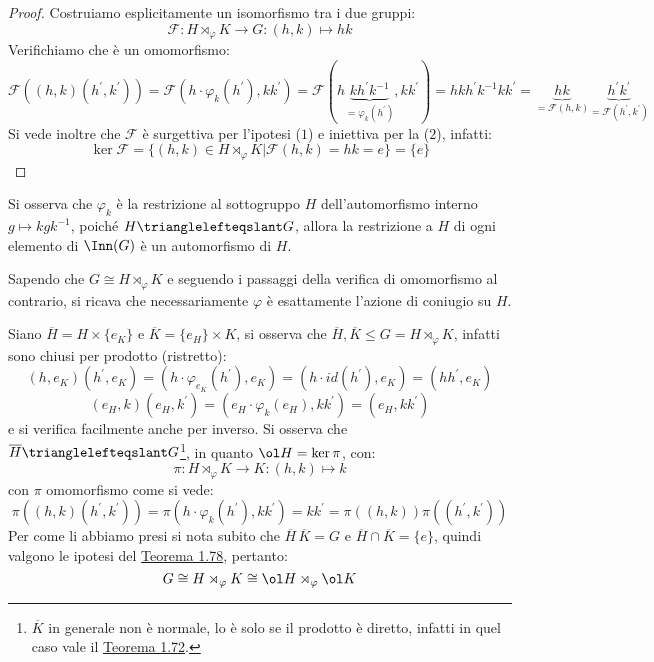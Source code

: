 \documentclass[11pt]{scrartcl}
\begin{document}
\begin{proof}
    Costruiamo esplicitamente un isomorfismo tra i due gruppi:
        \[ \mathcal{F} : H \rtimes_{\varphi} K \longrightarrow G : (h,k) \longmapsto hk
            \]
    Verifichiamo che è un omomorfismo:
        \[
            \mathcal{F}((h,k)(h^{\prime},k^{\prime})) = \mathcal{F}(h\cdot \varphi_k(h^{\prime}),kk^{\prime}) = \mathcal{F}(h\underbrace{kh^{\prime}k^{-1}}_{= \varphi_k(h^{\prime})},kk^{\prime})
            = hkh^{\prime}k^{-1}kk^{\prime} = \underbrace{hk}_{= \mathcal{F}(h,k)}\underbrace{h^{\prime}k^{\prime}}_{= \mathcal{F}(h^{\prime},k^{\prime})}
        \]
    Si vede inoltre che $\mathcal{F}$ è surgettiva per l'ipotesi ($1$) e iniettiva per la ($2$), infatti:
        \[ \ker\mathcal{F} = \{(h,k) \in  H \rtimes_{\varphi} K | \mathcal{F}(h,k) = hk = e\} = \{e\}
            \]
\end{proof}

\begin{remark}
    Si osserva che $\varphi_k$ è la restrizione al sottogruppo $H$ dell'automorfismo interno $g \longmapsto kgk^{-1}$, poiché
    $H \trianglelefteqslant G$, allora la restrizione a $H$ di ogni elemento di $\Inn(G)$ è un automorfismo di $H$.
\end{remark}

\begin{remark}
    Sapendo che $G \cong H \rtimes_{\varphi} K$ e seguendo i passaggi della verifica di omomorfismo al contrario, si ricava che necessariamente $\varphi$ è esattamente
    l'azione di coniugio su $H$.
\end{remark}

\pagebreak

\begin{remark}
    Siano $\overline H = H \times \{e_K\}$ e $\overline K = \{e_H\} \times K$, si osserva che $\overline H, \overline K \leqslant G = H \rtimes_{\varphi} K$, infatti sono chiusi per prodotto (ristretto):
        \[ (h,e_K)(h^{\prime},e_K) = (h \cdot \varphi_{e_K}(h^{\prime}), e_K) = (h \cdot id(h^{\prime}), e_K) = (hh^{\prime},e_K)
        \]\[ (e_H,k)(e_H,k^{\prime}) = (e_H \cdot \varphi_k(e_H), kk^{\prime}) = (e_H,kk^{\prime})
            \]
    e si verifica facilmente anche per inverso. Si osserva che $\overline H \trianglelefteqslant G$\footnote{$\overline K$ in generale non è normale, lo è solo se il prodotto è diretto, infatti in quel caso vale il \hyperref[t:1.72]{Teorema 1.72}.},
    in quanto $\ol H = \ker \pi$, con:
        \[ \pi : H \rtimes_{\varphi} K \longrightarrow K: (h,k) \longmapsto k
            \]
    con $\pi$ omomorfismo come si vede:
        \[ \pi((h,k)(h^{\prime},k^{\prime})) = \pi(h \cdot \varphi_k(h^{\prime}),kk^{\prime}) = kk^{\prime} = \pi((h,k))\pi((h^{\prime},k^{\prime}))
            \]
    Per come li abbiamo presi si nota subito che $\overline H \, \overline K = G$ e $\overline H \cap \overline K = \{e\}$, quindi valgono le ipotesi del \hyperref[t:1.78]{Teorema 1.78}, pertanto:
        \[ G \cong H \rtimes_{\varphi} K \cong \ol H \rtimes_{\varphi} \ol K
            \]
\end{remark}
\end{document}
